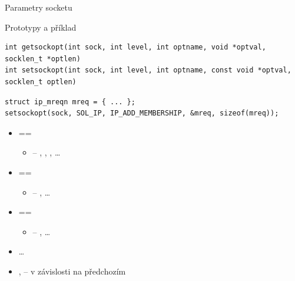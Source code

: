 \begin{frame}[fragile]{Parametry socketu}

  \begin{block}{Prototypy a příklad}
  \begin{lstlisting}[aboveskip=2pt]
int getsockopt(int sock, int level, int optname, void *optval, socklen_t *optlen)
int setsockopt(int sock, int level, int optname, const void *optval, socklen_t optlen)
  \end{lstlisting}
  \begin{lstlisting}[belowskip=2pt]
struct ip_mreqn mreq = { ... };
setsockopt(sock, SOL_IP, IP_ADD_MEMBERSHIP, &mreq, sizeof(mreq));
  \end{lstlisting}
  \end{block}


  \begin{itemize}
    \item {} == 
    \begin{itemize}
      \item {} -- , ,
	, \dots
    \end{itemize}

    \pause

    \item {} == 
    \begin{itemize}
      \item {} -- , \dots
    \end{itemize}

    \item {} == 
    \begin{itemize}
      \item {} -- , \dots
    \end{itemize}

    \item \dots

    \pause

    \item {},  -- v závislosti na předchozím

  \end{itemize}

\end{frame}


